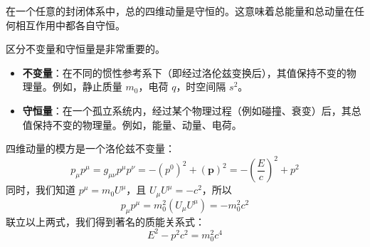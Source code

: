 \documentclass[fontset=none]{ctexart}
\begin{document}
\begin{theorem}[能量-动量守恒]
在一个任意的封闭体系中，总的四维动量是守恒的。这意味着总能量和总动量在任何相互作用中都各自守恒。
\end{theorem}

\begin{proposition}
区分不变量和守恒量是非常重要的。
\begin{itemize}
    \item \textbf{不变量}：在不同的惯性参考系下（即经过洛伦兹变换后），其值保持不变的物理量。例如，静止质量 $m_0$，电荷 $q$，时空间隔 $s^2$。
    \item \textbf{守恒量}：在一个孤立系统内，经过某个物理过程（例如碰撞、衰变）后，其总值保持不变的物理量。例如，能量、动量、电荷。
\end{itemize}
\end{proposition}

四维动量的模方是一个洛伦兹不变量：
\begin{equation}
p_{\mu}p^{\mu} = g_{\mu\nu}p^{\mu}p^{\nu} = -(p^0)^2 + (\bm{p})^2 = -(\frac{E}{c})^2 + p^2
\end{equation}
同时，我们知道 $p^{\mu} = m_0 U^{\mu}$，且 $U_{\mu}U^{\mu} = -c^2$，所以
\begin{equation}
p_{\mu}p^{\mu} = m_0^2 (U_{\mu}U^{\mu}) = -m_0^2 c^2
\end{equation}
联立以上两式，我们得到著名的质能关系式：
\begin{equation}
E^2 - p^2c^2 = m_0^2 c^4
\end{equation}
\end{document}
